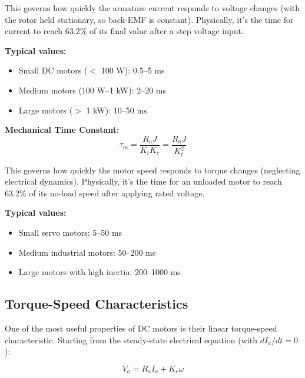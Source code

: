 This governs how quickly the armature current responds to voltage changes (with the rotor held stationary, so back-EMF is constant). Physically, it's the time for current to reach 63.2\% of its final value after a step voltage input.

\textbf{Typical values:}
\begin{itemize}
    \item Small DC motors ($<$ 100 W): 0.5--5 ms
    \item Medium motors (100 W--1 kW): 2--20 ms
    \item Large motors ($>$ 1 kW): 10--50 ms
\end{itemize}

\textbf{Mechanical Time Constant:}
\begin{equation}
    \boxed{\tau_m = \frac{R_a J}{K_t K_e} = \frac{R_a J}{K_t^2}}
    \label{eq:mechanical_time_constant}
\end{equation}

This governs how quickly the motor speed responds to torque changes (neglecting electrical dynamics). Physically, it's the time for an unloaded motor to reach 63.2\% of its no-load speed after applying rated voltage.

\textbf{Typical values:}
\begin{itemize}
    \item Small servo motors: 5--50 ms
    \item Medium industrial motors: 50--200 ms
    \item Large motors with high inertia: 200--1000 ms
\end{itemize}


\subsection{Torque-Speed Characteristics}

One of the most useful properties of DC motors is their linear torque-speed characteristic. Starting from the steady-state electrical equation (with $dI_a/dt = 0$):

\begin{equation}
    V_a = R_a I_a + K_e \omega
\end{equation}

